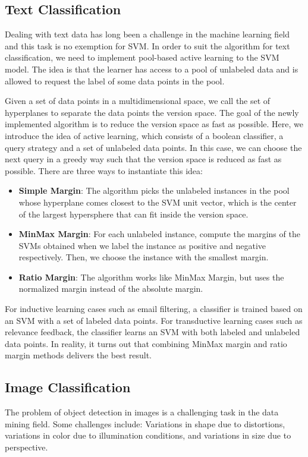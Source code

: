 \subsection*{Text Classification}
Dealing with text data has long been a challenge in the machine learning
field and this task is no exemption for SVM. In order to suit the algorithm
for text classification, we need to implement pool-based active learning
to the SVM model. The idea is that the learner has access to a pool of
unlabeled data and is allowed to request the label of some data points
in the pool.

Given a set of data points in a multidimensional space, we call the set
of hyperplanes to separate the data points the version space. The goal of
the newly implemented algorithm is to reduce the version space as fast as
possible. Here, we introduce the idea of active learning, which consists of
a boolean classifier, a query strategy and a set of unlabeled data points.
In this case, we can choose the next query in a greedy way such that 
the version space is reduced as fast as possible. There are three ways
to instantiate this idea: 

\begin{itemize}
    \item \textbf{Simple Margin}: The algorithm picks the unlabeled instances
    in the pool whose hyperplane comes closest to the SVM unit vector, which is
    the center of the largest hypersphere that can fit inside the version space.
    \item \textbf{MinMax Margin}: For each unlabeled instance, compute the margins
    of the SVMs obtained when we label the instance as positive and negative
    respectively. Then, we choose the instance with the smallest margin.
    \item \textbf{Ratio Margin}: The algorithm works like MinMax Margin, but uses
    the normalized margin instead of the absolute margin.
\end{itemize}

For inductive learning cases such as email filtering, a classifier is trained 
based on an SVM with a set of labeled data points. 
For transductive learning cases such as relevance feedback, the classifier
learns an SVM with both labeled and unlabeled data points. In reality, it turns
out that combining MinMax margin and ratio margin methods delivers the best
result. \cite{text-classification}

\subsection*{Image Classification}
The problem of object detection in images is a challenging task in the
data mining field. Some challenges include: Variations in shape
due to distortions, variations in color due to illumination conditions,
and variations in size due to perspective. 

